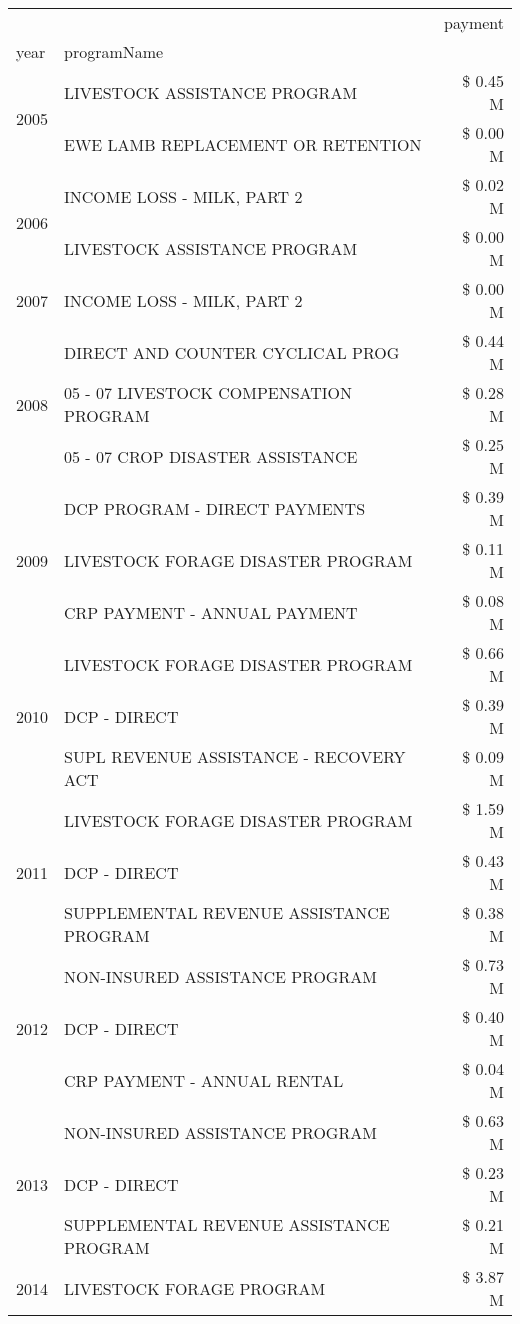 \begin{tabular}{llr}
\toprule
 &  & payment \\
year & programName &  \\
\midrule
\multirow[t]{2}{*}{2005} & LIVESTOCK ASSISTANCE PROGRAM & \$ 0.45 M \\
 & EWE LAMB REPLACEMENT OR RETENTION & \$ 0.00 M \\
\cline{1-3}
\multirow[t]{2}{*}{2006} & INCOME LOSS - MILK, PART 2 & \$ 0.02 M \\
 & LIVESTOCK ASSISTANCE PROGRAM & \$ 0.00 M \\
\cline{1-3}
2007 & INCOME LOSS - MILK, PART 2 & \$ 0.00 M \\
\cline{1-3}
\multirow[t]{3}{*}{2008} & DIRECT AND COUNTER CYCLICAL PROG & \$ 0.44 M \\
 & 05 - 07 LIVESTOCK COMPENSATION PROGRAM & \$ 0.28 M \\
 & 05 - 07 CROP DISASTER ASSISTANCE & \$ 0.25 M \\
\cline{1-3}
\multirow[t]{3}{*}{2009} & DCP PROGRAM - DIRECT PAYMENTS & \$ 0.39 M \\
 & LIVESTOCK FORAGE DISASTER  PROGRAM & \$ 0.11 M \\
 & CRP PAYMENT - ANNUAL PAYMENT & \$ 0.08 M \\
\cline{1-3}
\multirow[t]{3}{*}{2010} & LIVESTOCK FORAGE DISASTER PROGRAM & \$ 0.66 M \\
 & DCP - DIRECT & \$ 0.39 M \\
 & SUPL REVENUE ASSISTANCE - RECOVERY ACT & \$ 0.09 M \\
\cline{1-3}
\multirow[t]{3}{*}{2011} & LIVESTOCK FORAGE DISASTER PROGRAM & \$ 1.59 M \\
 & DCP - DIRECT & \$ 0.43 M \\
 & SUPPLEMENTAL REVENUE ASSISTANCE PROGRAM & \$ 0.38 M \\
\cline{1-3}
\multirow[t]{3}{*}{2012} & NON-INSURED ASSISTANCE PROGRAM & \$ 0.73 M \\
 & DCP - DIRECT & \$ 0.40 M \\
 & CRP PAYMENT - ANNUAL RENTAL & \$ 0.04 M \\
\cline{1-3}
\multirow[t]{3}{*}{2013} & NON-INSURED ASSISTANCE PROGRAM & \$ 0.63 M \\
 & DCP - DIRECT & \$ 0.23 M \\
 & SUPPLEMENTAL REVENUE ASSISTANCE PROGRAM & \$ 0.21 M \\
\cline{1-3}
\multirow[t]{3}{*}{2014} & LIVESTOCK FORAGE PROGRAM & \$ 3.87 M \\

\end{tabular}
